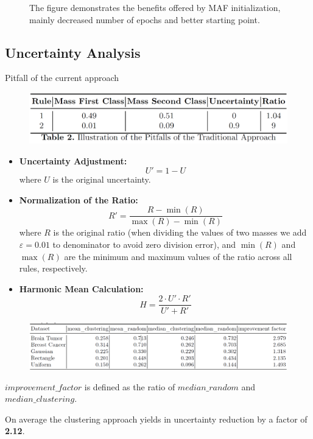 \documentclass[aspectratio=169]{beamer}
\begin{document}
\begin{frame}
\begin{figure}
\begin{minipage}{0.49\textwidth}
    \end{minipage}
    \caption{The figure demonstrates the benefits offered by MAF initialization, mainly decreased number of epochs and better starting point.}
    \label{fig:maf_benefits}
\end{figure}
\end{frame}

\subsection{Uncertainty Analysis}
\begin{frame}{Pitfall of the current approach}
\begin{figure}
    \centering
    \includegraphics[width=1\linewidth]{../../fig/pitfalls.png}
\end{figure}
\end{frame}

\begin{frame}
\begin{itemize}
\item \textbf{Uncertainty Adjustment:}
    \[
    U' = 1 - U
    \]
    where \( U \) is the original uncertainty.
    \pause
    \item \textbf{Normalization of the Ratio:}
    \[
    R' = \frac{R - \min(R)}{\max(R) - \min(R)}
    \]
    where \( R \) is the original ratio (when dividing the values of two masses we
add $\varepsilon=0.01$ to denominator to avoid zero division error), and \( \min(R) \) and \( \max(R) \) are the minimum and maximum values of the ratio across all rules, respectively.
    \pause
    \item \textbf{Harmonic Mean Calculation:}
    \[
    H = \frac{2 \cdot U' \cdot R'}{U' + R'}
    \]
\end{itemize}
\end{frame}

\begin{frame}
\begin{figure}
    \centering
    \includegraphics[width=1\linewidth]{../../fig/unc_df.png}
\end{figure}
$improvement\_factor$ is defined as the ratio of $median\_random$ and $median\_clustering$. 

On average the clustering approach yields in uncertainty reduction by a factor of \textbf{2.12}.
\end{frame}
\end{document}
